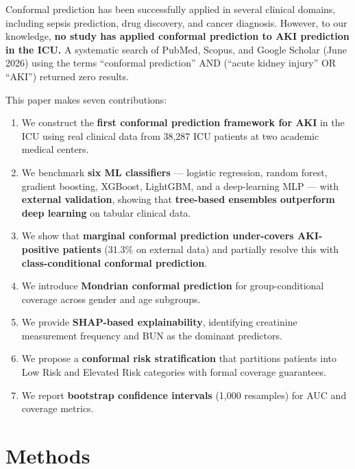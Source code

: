 \documentclass[12pt]{article}
\begin{document}
Conformal prediction has been successfully applied in several
clinical domains, including sepsis
prediction,\cite{lu2022fair} drug
discovery,\cite{norinder2014introducing} and cancer
diagnosis.\cite{lambrou2012reliable}  However, to our knowledge,
\textbf{no study has applied conformal prediction to AKI
prediction in the ICU.}  A systematic search of PubMed, Scopus,
and Google Scholar (June 2026) using the terms ``conformal
prediction'' AND (``acute kidney injury'' OR ``AKI'') returned
zero results.

This paper makes seven contributions:
\begin{enumerate}
\item We construct the \textbf{first conformal prediction
framework for AKI} in the ICU using real clinical data from
38{,}287 ICU patients at two academic medical centers.

\item We benchmark \textbf{six ML classifiers} --- logistic
regression, random forest, gradient boosting, XGBoost,
LightGBM, and a deep-learning MLP --- with \textbf{external
validation}, showing that \textbf{tree-based ensembles
outperform deep learning} on tabular clinical data.

\item We show that \textbf{marginal conformal prediction
under-covers AKI-positive patients} (31.3\% on external
data) and partially resolve this with
\textbf{class-conditional conformal
prediction}.\cite{romano2020classification}

\item We introduce \textbf{Mondrian conformal prediction}
for group-conditional coverage across gender and age
subgroups.

\item We provide \textbf{SHAP-based explainability},
identifying creatinine measurement frequency and BUN as
the dominant predictors.

\item We propose a \textbf{conformal risk stratification}
that partitions patients into Low Risk and Elevated Risk
categories with formal coverage guarantees.

\item We report \textbf{bootstrap confidence intervals}
(1{,}000 resamples) for AUC and coverage metrics.
\end{enumerate}


\section{Methods}
\label{sec:methods}
\end{document}
